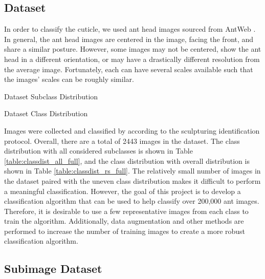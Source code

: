\documentclass{aci}
\begin{document}
\subsection{Dataset}
In order to classify the cuticle, we used ant head images sourced from AntWeb
\cite{antweb}. In general, the ant head images are centered in the image, facing
the front, and share a similar posture. However, some images may not be
centered, show the ant head in a different orientation, or may have a
drastically different resolution from the average image. Fortunately, each can
have several scales available such that the images' scales can be roughly
similar.

\begin{table}[ht]
  \centering
  \caption{Dataset Subclass Distribution}
  \label{table:classdist_all_full}
  
\end{table}

\begin{table}[ht]
  \centering
  \caption{Dataset Class Distribution}
  \label{table:classdist_rs_full}
  
\end{table}

Images were collected and classified by according to the sculpturing
identification protocol. Overall, there are a total of 2443 images in the
dataset. The class distribution with all considered subclasses is shown in Table
\ref{table:classdist_all_full}, and the class distribution with overall
distribution is shown in Table \ref{table:classdist_rs_full}. The relatively
small number of images in the dataset paired with the uneven class distribution
makes it difficult to perform a meaningful classification. However, the goal of
this project is to develop a classification algorithm that can be used to help
classify over 200,000 ant images. Therefore, it is desirable to use a few
representative images from each class to train the algorithm. Additionally, data
augmentation and other methods are performed to increase the number of training
images to create a more robust classification algorithm.

\subsection{Subimage Dataset}
\end{document}
